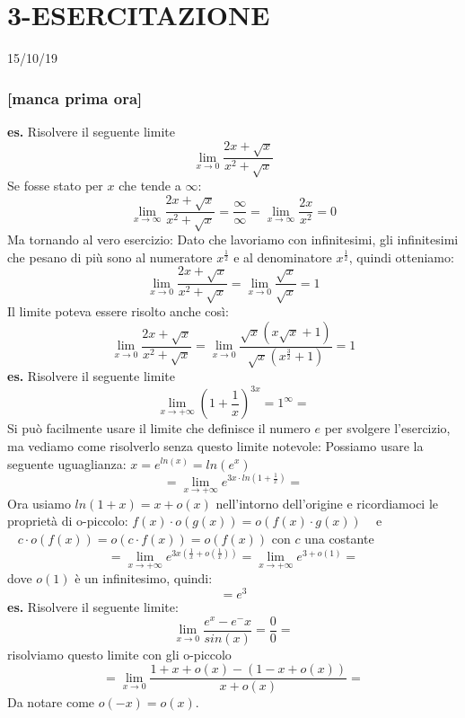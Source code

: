 \section*{3-ESERCITAZIONE}
15/10/19
\subsubsection*{[manca prima ora]}
\textbf{es.} Risolvere il seguente limite
\[
    \lim_{x\rightarrow 0}\frac{2x+ \sqrt{x}}{x^2+\sqrt{x}}
\]
Se fosse stato per $x$ che tende a $\infty$:
\[
    \lim_{x\rightarrow \infty}\frac{2x+ \sqrt{x}}{x^2+\sqrt{x}} =  \frac{\infty}{\infty} = \lim_{x\rightarrow \infty}\frac{2x}{x^2} = 0
\]
Ma tornando al vero esercizio:
\newline
Dato che lavoriamo con infinitesimi, gli infinitesimi che pesano di più sono al numeratore $x^{\frac{1}{2}}$ e al denominatore $x^{\frac{1}{2}}$, quindi otteniamo:
\[
    \lim_{x\rightarrow 0}\frac{2x+ \sqrt{x}}{x^2+\sqrt{x}} = \lim_{x\rightarrow 0} \frac{\sqrt{x}}{\sqrt{x}} = 1
\]
Il limite poteva essere risolto anche così:
\[
    \lim_{x\rightarrow 0}\frac{2x+ \sqrt{x}}{x^2+\sqrt{x}} = \lim_{x\rightarrow 0} \frac{\sqrt{x}(x \sqrt{x} +1)}{\sqrt{x}(x^{\frac{3}{2}}+1)} = 1
\]
\newline
\newline
\textbf{es.} Risolvere il seguente limite
\[
    \lim_{x\rightarrow + \infty} (1+ \frac{1}{x})^{3x} = 1 ^{\infty} = 
\]
Si può facilmente usare il limite che definisce il numero $e$ per svolgere l'esercizio, ma vediamo come risolverlo senza questo limite notevole:
\newline
Possiamo usare la seguente uguaglianza: $x= e^{ln(x)} = ln(e^x)$
\[
    = \lim_{x\rightarrow  + \infty} e^{3x \cdot ln(1+ \frac{1}{x})} =
\]
Ora usiamo $ln(1+x) = x +o(x)$ nell'intorno dell'origine e ricordiamoci le proprietà di o-piccolo: $f(x) \cdot  o(g(x)) = o(f(x) \cdot g(x)) \;\;\;$ e $\;\;\; c \cdot o(f(x)) = o(c \cdot f(x)) = o(f(x))$ con $c$ una costante
\[
    = \lim_{x\rightarrow + \infty} e^{3x(\frac{1}{x}+ o(\frac{1}{x}))} = \lim_{x\rightarrow +\infty} e^{3+o(1)} = 
\]
dove $o(1)$ è un infinitesimo, quindi:
\[
    = e^3
\]
\newline
\newline
\textbf{es.}  Risolvere il seguente limite:
\[
    \lim_{x\rightarrow 0} \frac{e^x - e ^-x}{sin(x)} = \frac{0}{0}=
\]
risolviamo questo limite con gli o-piccolo
\[
    =\lim_{x\rightarrow 0} \frac{1+x+o(x)-(1-x+o(x))}{x + o(x)} =
\]
Da notare come $o(-x) = o(x)$.
\newline
